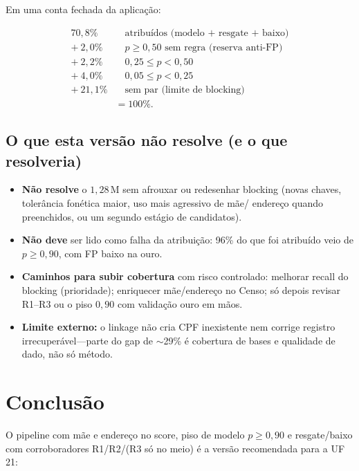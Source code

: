 \documentclass[11pt,a4paper]{article}
\begin{document}
Em uma conta fechada da aplicação:

\[
\begin{aligned}
70{,}8\% &\quad\text{atribuídos (modelo + resgate + baixo)}\\
+\ 2{,}0\% &\quad p\ge 0{,}50\text{ sem regra (reserva anti-FP)}\\
+\ 2{,}2\% &\quad 0{,}25\le p<0{,}50\\
+\ 4{,}0\% &\quad 0{,}05\le p<0{,}25\\
+\ 21{,}1\% &\quad\text{sem par (limite de blocking)}\\
&= 100\%.
\end{aligned}
\]

\subsection{O que esta versão não resolve (e o que resolveria)}

\begin{itemize}
  \item \textbf{Não resolve} o $1{,}28$\,M sem afrouxar ou redesenhar blocking
        (novas chaves, tolerância fonética maior, uso mais agressivo de mãe/
        endereço quando preenchidos, ou um segundo estágio de candidatos).
  \item \textbf{Não deve} ser lido como falha da atribuição: 96\% do que foi
        atribuído veio de $p \ge 0{,}90$, com FP baixo na ouro.
  \item \textbf{Caminhos para subir cobertura} com risco controlado: melhorar
        recall do blocking (prioridade); enriquecer mãe/endereço no Censo;
        só depois revisar R1--R3 ou o piso $0{,}90$ com validação ouro em
        mãos.
  \item \textbf{Limite externo:} o linkage não cria CPF inexistente nem
        corrige registro irrecuperável---parte do gap de $\sim$29\% é
        cobertura de bases e qualidade de dado, não só método.
\end{itemize}

\section{Conclusão}

O pipeline com mãe e endereço no score, piso de modelo $p \ge 0{,}90$ e
resgate/baixo com corroboradores R1/R2/(R3 só no meio) é a versão recomendada
para a UF\,21:
\end{document}
